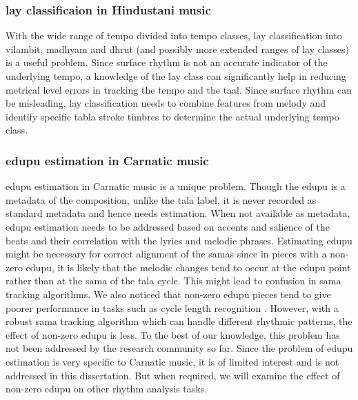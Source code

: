 \subsubsection{\Gls{lay} classificaion in Hindustani music}
With the wide range of tempo divided into tempo classes, \gls{lay} classification into \gls{vilambit}, \gls{madhyam} and \gls{dhrut} (and possibly more extended ranges of \gls{lay} classes) is a useful problem. Since surface rhythm is not an accurate indicator of the underlying tempo, a knowledge of the \gls{lay} class can significantly help in reducing metrical level errors in tracking the tempo and the \gls{taal}. Since surface rhythm can be misleading, \gls{lay} classification needs to combine features from melody and identify specific \gls{tabla} stroke timbres to determine the actual underlying tempo class. 
% 
\subsubsection{\Gls{edupu} estimation in Carnatic music}
\Gls{edupu} estimation in Carnatic music is a unique problem. Though the \gls{edupu} is a metadata of the composition, unlike the \gls{tala} label, it is never recorded as standard metadata and hence needs estimation. When not available as metadata, \gls{edupu} estimation needs to be addressed based on accents and salience of the beats and their correlation with the lyrics and melodic phrases. Estimating \gls{edupu} might be necessary for correct alignment of the \glspl{sama} since in pieces with a non-zero \gls{edupu}, it is likely that the melodic changes tend to occur at the \gls{edupu} point rather than at the sama of the \gls{tala} cycle. This might lead to confusion in sama tracking algorithms. We also noticed that non-zero \gls{edupu} pieces tend to give poorer performance in tasks such as cycle length recognition \cite{ajay:14:rhythmJNMR}. However, with a robust \gls{sama} tracking algorithm which can handle different rhythmic patterns, the effect of non-zero \gls{edupu} is less. To the best of our knowledge, this problem has not been addressed by the research community so far. Since the problem of \gls{edupu} estimation is very specific to Carnatic music, it is of limited interest and is not addressed in this dissertation. But when required, we will examine the effect of non-zero \gls{edupu} on other rhythm analysis tasks. 
%
